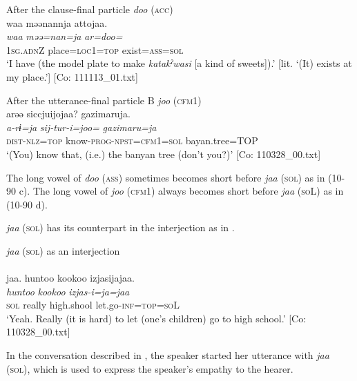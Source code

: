   \ex After the clause-final particle \textit{doo} (\textsc{acc})\\
      \glll    waa  məənannja  attojaa.\\
    \textit{waa}  \textit{məə=nan=ja}  \textit{ar=doo=}\\
    1\textsc{sg}.\textsc{adn}Z  place=\textsc{loc}1=\textsc{top}  exist=\textsc{ass}=\textsc{sol}\\
    \glt     ‘I have (the model plate to make \textit{katakˀwasi} [a kind of sweets]).’ [lit. ‘(It) exists at my place.’]  [Co: 111113\_01.txt]

   \ex After the utterance-final particle B \textit{joo} (\textsc{cfm}1)\\
      \glll    arəə  siccjuijojaa?  gazimaruja.\\
    \textit{a-rɨ=ja}  \textit{sij-tur-i=joo=}  \textit{gazimaru=ja}\\
    \textsc{dist}-\textsc{nlz}=\textsc{top}  know-\textsc{prog}-\textsc{npst}=\textsc{cfm}1=\textsc{sol}  bayan.tree=TOP\\
 \glt     ‘(You) know that, (i.e.) the banyan tree (don’t you?)’  [Co: 110328\_00.txt]
 \z
\z

The long vowel of \textit{doo} (\textsc{ass}) sometimes becomes short before \textit{jaa} (\textsc{sol}) as in (10-90 c). The long vowel of \textit{joo} (\textsc{cfm}1) always becomes short before \textit{jaa} (\textsc{so}L) as in (10-90 d).

  \textit{jaa} (\textsc{sol}) has its counterpart in the interjection as in .

\ea\label{ex:10.91}   \textit{jaa} (\textsc{sol}) as an interjection\\\\
      \glll    jaa.  huntoo  {\textbar}kookoo{\textbar}  izjasijajaa.\\
    \textit{}  \textit{huntoo}  \textit{kookoo}  \textit{izjas-i=ja=jaa}\\
    \textsc{sol}  really  high.shool  let.go-\textsc{inf}=\textsc{top}=\textsc{so}L\\
\glt     ‘Yeah. Really (it is hard) to let (one’s children) go to high school.’  [Co: 110328\_00.txt]
\z

In the conversation described in , the speaker started her utterance with \textit{jaa} (\textsc{sol}), which is used to express the speaker’s empathy to the hearer.

